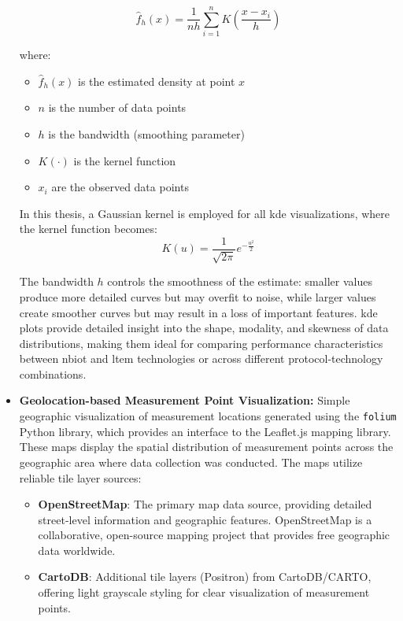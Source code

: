 \documentclass[12pt, english, openany]{book}
\begin{document}
\begin{itemize}
          \[
              \hat{f}_h(x) = \frac{1}{nh} \sum_{i=1}^{n} K\left(\frac{x - x_i}{h}\right)
          \]

          where:
          \begin{itemize}
              \item $\hat{f}_h(x)$ is the estimated density at point $x$
              \item $n$ is the number of data points
              \item $h$ is the bandwidth (smoothing parameter)
              \item $K(\cdot)$ is the kernel function
              \item $x_i$ are the observed data points
          \end{itemize}

          In this thesis, a Gaussian kernel is employed for all \gls{kde} visualizations, where the kernel function becomes:
          \[
              K(u) = \frac{1}{\sqrt{2\pi}} e^{-\frac{u^2}{2}}
          \]

          The bandwidth $h$ controls the smoothness of the estimate: smaller values produce more detailed curves but may overfit to noise, while larger values create smoother curves but may result in a loss of important features. \gls{kde} plots provide detailed insight into the shape, modality, and skewness of data distributions, making them ideal for comparing performance characteristics between \gls{nbiot} and \gls{ltem} technologies or across different protocol-technology combinations.

    \item \textbf{Geolocation-based Measurement Point Visualization:} Simple geographic visualization of measurement locations generated using the \texttt{folium} Python library, which provides an interface to the Leaflet.js mapping library. These maps display the spatial distribution of measurement points across the geographic area where data collection was conducted. The maps utilize reliable tile layer sources:

          \begin{itemize}
              \item \textbf{OpenStreetMap}: The primary map data source, providing detailed street-level information and geographic features. OpenStreetMap is a collaborative, open-source mapping project that provides free geographic data worldwide.
              \item \textbf{CartoDB}: Additional tile layers (Positron) from CartoDB/CARTO, offering light grayscale styling for clear visualization of measurement points.
          \end{itemize}


\end{itemize}
\end{document}
